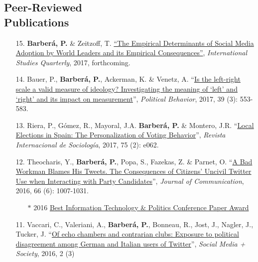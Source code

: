 \documentclass[margin,line,11pt]{resume}
\begin{document}
\begin{resume}
    \section{\mysidestyle Peer-Reviewed\\Publications}
\vspace{.15cm}    
\begin{itemize}[leftmargin=5.5mm]
\item[15.] \textbf{Barber\'{a}, P.} \& Zeitzoff, T. \href{https://academic.oup.com/isq/article/doi/10.1093/isq/sqx047/4430887/The-New-Public-Address-System-Why-Do-World-Leaders}{``The Empirical Determinants of Social Media Adoption by World Leaders and its Empirical Consequences''}, \textit{International Studies Quarterly}, 2017, forthcoming.
    
\item[14.] Bauer, P., \textbf{Barber\'{a}, P.}, Ackerman, K. \& Venetz, A. ``\href{http://link.springer.com/article/10.1007/s11109-016-9368-2}{Is the left-right scale a valid measure of ideology? Investigating the meaning of `left' and `right' and its impact on measurement}'', \textit{Political Behavior}, 2017, 39 (3): 553-583.

\item[13.] Riera, P., G\'{o}mez, R., Mayoral, J.A. \textbf{Barber\'{a}, P.} \& Montero, J.R. ``\href{http://revintsociologia.revistas.csic.es/index.php/revintsociologia/article/view/675/832}{Local Elections in Spain: The Personalization of Voting Behavior}'', \textit{Revista Internacional de Sociolog\'{i}a}, 2017, 75 (2): e062.
    
\item[12.] Theocharis, Y., \textbf{Barber\'{a}, P.}, Popa, S., Fazekas, Z. \& Parnet, O. ``\href{http://onlinelibrary.wiley.com/doi/10.1111/jcom.12259/abstract}{A Bad Workman Blames His Tweets. The Consequences of Citizens' Uncivil Twitter Use when Interacting with Party Candidates}'', \textit{Journal of Communication}, 2016, 66 (6): 1007-1031.
\begin{itemize}
\item[] $\ast$ 2016 \href{http://www.apsanet.org/section-18-best-conference-paper-award}{Best Information Technology \& Politics Conference Paper Award}
\end{itemize}
    
\item[11.] Vaccari, C., Valeriani, A., \textbf{Barber\'{a}, P.}, Bonneau, R., Jost, J., Nagler, J., Tucker, J. ``\href{http://sms.sagepub.com/content/2/3/2056305116664221.abstract}{Of echo chambers and contrarian clubs: Exposure to political disagreement among German and Italian users of Twitter}'', \textit{Social Media + Society}, 2016, 2 (3)


\end{itemize}
\end{resume}
\end{document}
